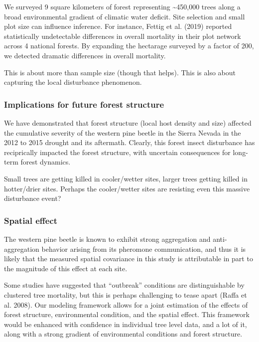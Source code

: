 \documentclass[]{article}
\begin{document}
We surveyed 9 square kilometers of forest representing
\textasciitilde{}450,000 trees along a broad environmental gradient of
climatic water deficit. Site selection and small plot size can influence
inference. For instance, Fettig et al. (2019) reported statistically
undetectable differences in overall mortality in their plot network
across 4 national forests. By expanding the hectarage surveyed by a
factor of 200, we detected dramatic differences in overall mortality.

This is about more than sample size (though that helps). This is also
about capturing the local disturbance phenomenon.

\subsubsection{Implications for future forest
structure}\label{implications-for-future-forest-structure}

We have demonstrated that forest structure (local host density and size)
affected the cumulative severity of the western pine beetle in the
Sierra Nevada in the 2012 to 2015 drought and its aftermath. Clearly,
this forest insect disturbance has reciprically impacted the forest
structure, with uncertain consequences for long-term forest dynamics.

Small trees are getting killed in cooler/wetter sites, larger trees
getting killed in hotter/drier sites. Perhaps the cooler/wetter sites
are resisting even this massive disturbance event?

\subsubsection{Spatial effect}\label{spatial-effect}

The western pine beetle is known to exhibit strong aggregation and
anti-aggregation behavior arising from its pheromone communication, and
thus it is likely that the measured spatial covariance in this study is
attributable in part to the magnitude of this effect at each site.

Some studies have suggested that ``outbreak'' conditions are
distinguishable by clustered tree mortality, but this is perhaps
challenging to tease apart (Raffa et al. 2008). Our modeling framework
allows for a joint estimation of the effects of forest structure,
environmental condition, and the spatial effect. This framework would be
enhanced with confidence in individual tree level data, and a lot of it,
along with a strong gradient of environmental conditions and forest
structure.
\end{document}
